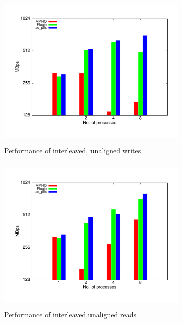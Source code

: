 \begin{figure}[!t]
\centering
\includegraphics[width=3.6in,height=3.0in]{interleaved_w}
\caption{Performance of interleaved, unaligned writes}
\label{write_interleaved}
\end{figure}

\begin{figure}[!t]
\centering
\includegraphics[width=3.6in,height=3.0in]{interleaved_r}
\caption{Performance of interleaved,unaligned reads}
\label{read_interleaved}
\end{figure}



